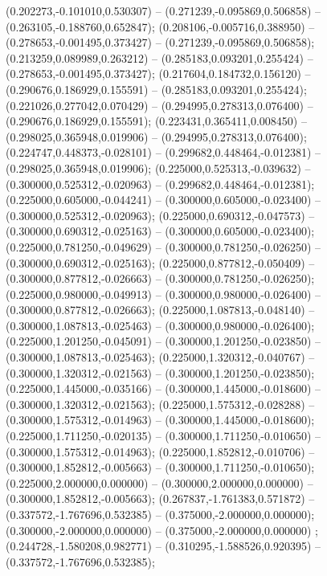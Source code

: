  (0.202273,-0.101010,0.530307) -- (0.271239,-0.095869,0.506858) -- (0.263105,-0.188760,0.652847);
 (0.208106,-0.005716,0.388950) -- (0.278653,-0.001495,0.373427) -- (0.271239,-0.095869,0.506858);
 (0.213259,0.089989,0.263212) -- (0.285183,0.093201,0.255424) -- (0.278653,-0.001495,0.373427);
 (0.217604,0.184732,0.156120) -- (0.290676,0.186929,0.155591) -- (0.285183,0.093201,0.255424);
 (0.221026,0.277042,0.070429) -- (0.294995,0.278313,0.076400) -- (0.290676,0.186929,0.155591);
 (0.223431,0.365411,0.008450) -- (0.298025,0.365948,0.019906) -- (0.294995,0.278313,0.076400);
 (0.224747,0.448373,-0.028101) -- (0.299682,0.448464,-0.012381) -- (0.298025,0.365948,0.019906);
 (0.225000,0.525313,-0.039632) -- (0.300000,0.525312,-0.020963) -- (0.299682,0.448464,-0.012381);
 (0.225000,0.605000,-0.044241) -- (0.300000,0.605000,-0.023400) -- (0.300000,0.525312,-0.020963);
 (0.225000,0.690312,-0.047573) -- (0.300000,0.690312,-0.025163) -- (0.300000,0.605000,-0.023400);
 (0.225000,0.781250,-0.049629) -- (0.300000,0.781250,-0.026250) -- (0.300000,0.690312,-0.025163);
 (0.225000,0.877812,-0.050409) -- (0.300000,0.877812,-0.026663) -- (0.300000,0.781250,-0.026250);
 (0.225000,0.980000,-0.049913) -- (0.300000,0.980000,-0.026400) -- (0.300000,0.877812,-0.026663);
 (0.225000,1.087813,-0.048140) -- (0.300000,1.087813,-0.025463) -- (0.300000,0.980000,-0.026400);
 (0.225000,1.201250,-0.045091) -- (0.300000,1.201250,-0.023850) -- (0.300000,1.087813,-0.025463);
 (0.225000,1.320312,-0.040767) -- (0.300000,1.320312,-0.021563) -- (0.300000,1.201250,-0.023850);
 (0.225000,1.445000,-0.035166) -- (0.300000,1.445000,-0.018600) -- (0.300000,1.320312,-0.021563);
 (0.225000,1.575312,-0.028288) -- (0.300000,1.575312,-0.014963) -- (0.300000,1.445000,-0.018600);
 (0.225000,1.711250,-0.020135) -- (0.300000,1.711250,-0.010650) -- (0.300000,1.575312,-0.014963);
 (0.225000,1.852812,-0.010706) -- (0.300000,1.852812,-0.005663) -- (0.300000,1.711250,-0.010650);
 (0.225000,2.000000,0.000000) -- (0.300000,2.000000,0.000000) -- (0.300000,1.852812,-0.005663);
 (0.267837,-1.761383,0.571872) -- (0.337572,-1.767696,0.532385) -- (0.375000,-2.000000,0.000000);
 (0.300000,-2.000000,0.000000) -- (0.375000,-2.000000,0.000000) ;
 (0.244728,-1.580208,0.982771) -- (0.310295,-1.588526,0.920395) -- (0.337572,-1.767696,0.532385);

